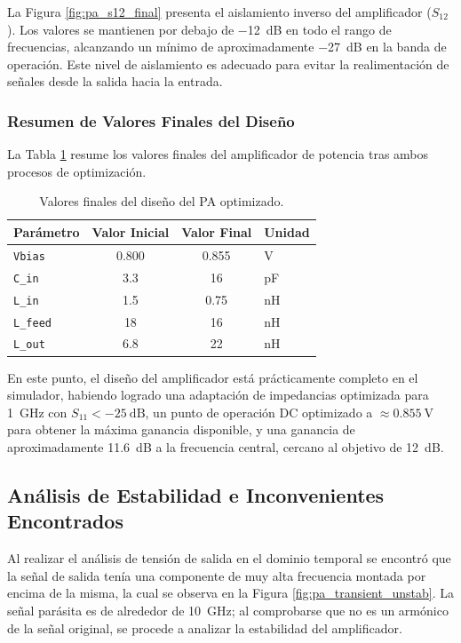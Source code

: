 La Figura \ref{fig:pa_s12_final} presenta el aislamiento inverso del amplificador ($S_{12}$). Los valores se mantienen por debajo de \qty{-12}{\dB} en todo el rango de frecuencias, alcanzando un mínimo de aproximadamente \qty{-27}{\dB} en la banda de operación. Este nivel de aislamiento es adecuado para evitar la realimentación de señales desde la salida hacia la entrada.

\subsubsection{Resumen de Valores Finales del Diseño}

La Tabla \ref{tab:pa_final_values} resume los valores finales del amplificador de potencia tras ambos procesos de optimización.

\begin{table}[htbp]
\centering
\small
\caption{Valores finales del diseño del PA optimizado.}
\label{tab:pa_final_values}
\begin{tabular}{@{}lccl@{}}
\toprule
\textbf{Parámetro} & \textbf{Valor Inicial} & \textbf{Valor Final} & \textbf{Unidad} \\
\midrule
\texttt{Vbias}   & 0.800    & 0.855    & V  \\
\texttt{C\_in}   & 3.3      & 16       & pF \\
\texttt{L\_in}   & 1.5      & 0.75     & nH \\
\texttt{L\_feed} & 18       & 16       & nH \\
\texttt{L\_out}  & 6.8      & 22       & nH \\
\bottomrule
\end{tabular}
\end{table}

En este punto, el diseño del amplificador está prácticamente completo en el simulador, habiendo logrado una adaptación de impedancias optimizada para \qty{1}{\GHz} con $S_{11} < \qty{-25}{\dB}$, un punto de operación DC optimizado a $\approx \qty{0,855}{\V}$ para obtener la máxima ganancia disponible, y una ganancia de aproximadamente \qty{11,6}{\dB} a la frecuencia central, cercano al objetivo de \qty{12}{\dB}.

\subsection{Análisis de Estabilidad e Inconvenientes Encontrados}

Al realizar el análisis de tensión de salida en el dominio temporal se encontró que la señal de salida tenía una componente de muy alta frecuencia montada por encima de la misma, la cual se observa en la Figura \ref{fig:pa_transient_unstab}. La señal parásita es de alrededor de \qty{10}{\GHz}; al comprobarse que no es un armónico de la señal original, se procede a analizar la estabilidad del amplificador.

